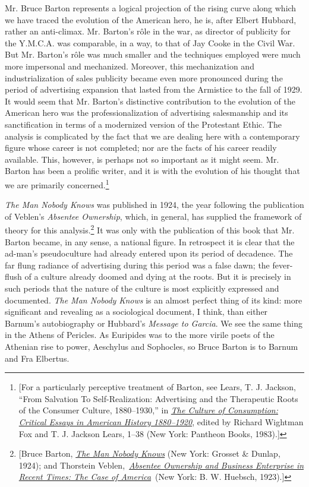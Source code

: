 \documentclass[nohyper,openany,nobib]{tufte-book}
\begin{document}
 Mr. Bruce Barton represents a logical projection of the rising
curve along which we have traced the evolution of the American hero, he
is, after Elbert Hubbard, rather an anti-climax. Mr. Barton's r\^ole in
the war, as director of publicity for the Y.M.C.A. was comparable, in a
way, to that of Jay Cooke in the Civil War. But Mr. Barton's r\^ole was
much smaller and the techniques employed were much more impersonal and
mechanized. Moreover, this mechanization and industrialization of sales
publicity became even more pronounced during the period of advertising
expansion that lasted from the Armistice to the fall of 1929. It would
seem that Mr. Barton's distinctive contribution to the evolution of the
American hero was the professionalization of advertising salesmanship
and its sanctification in terms of a modernized version of the
Protestant Ethic. The analysis is complicated by the fact that we are
dealing here with a contemporary figure whose career is not completed;
nor are the facts of his career readily available. This, however, is
perhaps not so important as it might seem. Mr. Barton has been a
prolific writer, and it is with the evolution of his thought that we are
primarily concerned.\footnote{{[}For a particularly perceptive treatment of Barton, see Lears, T. J.
  Jackson, ``From Salvation To Self-Realization: Advertising and the
  Therapeutic Roots of the Consumer Culture, 1880--1930,'' in
  \emph{\href{http://www.worldcat.org/oclc/654538769}{The Culture of
  Consumption: Critical Essays in American History 1880--1920}}, edited
  by Richard Wightman Fox and T. J. Jackson Lears, 1--38 (New York:
  Pantheon Books, 1983).{]}}
  
\enlargethispage{\baselineskip}

\emph{The Man Nobody Knows} was published in 1924, the year following
the publication of Veblen's \emph{Absentee Ownership}, which, in
general, has supplied the framework of theory for this analysis.\footnote{{[}Bruce Barton,
  \emph{\href{http://www.worldcat.org/oclc/70421692}{The Man Nobody
  Knows}} (New York: Grosset \& Dunlap, 1924); and Thorstein
  Veblen,~\emph{\href{http://www.worldcat.org/oclc/752183}{Absentee
  Ownership and Business Enterprise in Recent Times: The Case of
  America}}~(New York: B. W. Huebsch, 1923).{]}} It
was only with the publication of this book that Mr. Barton became, in
any sense, a national figure. In retrospect it is clear that the
ad-man's pseudoculture had already entered upon its period of decadence.
The far flung radiance of advertising during this period was a false
dawn; the fever-flush of a culture already doomed and dying at the
roots. But it is precisely in such periods that the nature of the
culture is most explicitly expressed and documented. \emph{The Man
Nobody Knows} is an almost perfect thing of its kind: more significant
and revealing as a sociological document, I think, than either Barnum's
autobiography or Hubbard's \emph{Message to Garcia}. We see the same
thing in the Athens of Pericles. As Euripides was to the more virile
poets of the Athenian rise to power, Aeschylus and Sophocles, so Bruce
Barton is to Barnum and Fra Elbertus.
\end{document}
